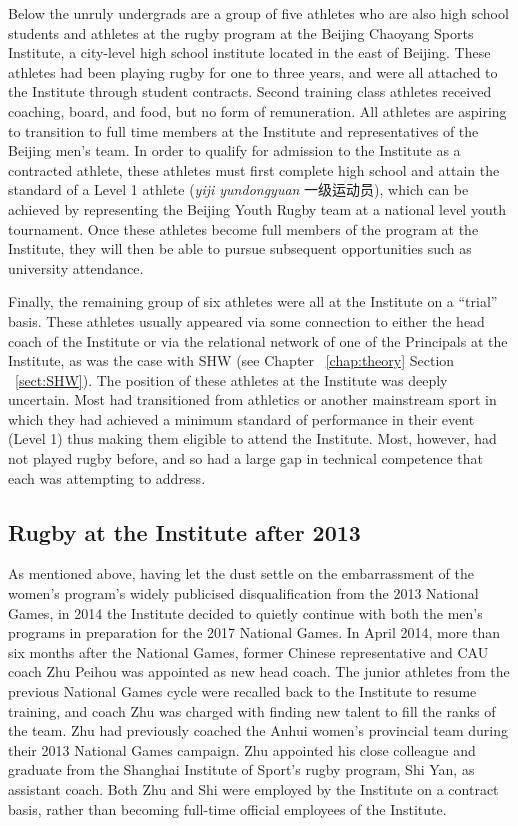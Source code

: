 \begin{CJK}{UTF8}{gbsn}
Below the unruly undergrads are a group of five athletes who are also high school students and athletes at the rugby program at the Beijing Chaoyang Sports Institute, a city-level high school institute located in the east of Beijing.  These athletes had been playing rugby for one to three years, and were all attached to the Institute through student contracts.  Second training class athletes received coaching, board, and food, but no form of remuneration.  All athletes are aspiring to transition to full time members at the Institute and representatives of the Beijing men's team.  In order to qualify for admission to the Institute as a contracted athlete, these athletes must first complete high school and attain the standard of a Level 1 athlete (\textit{yiji yundongyuan} 一级运动员), which can be achieved by representing the Beijing Youth Rugby team at a national level youth tournament.  Once these athletes become full members of the program at the Institute, they will then be able to pursue subsequent opportunities such as university attendance.

Finally, the remaining group of six athletes were all at the Institute on a ``trial'' basis.  These athletes usually appeared via some connection to either the head coach of the Institute or via the relational network of one of the Principals at the Institute, as was the case with SHW (see Chapter ~\ref{chap:theory} Section ~\ref{sect:SHW}). The position of these athletes at the Institute was deeply uncertain.  Most had transitioned from athletics or another mainstream sport in which they had achieved a minimum standard of performance in their event (Level 1) thus making them eligible to attend the Institute.  Most, however, had not played rugby before, and so had a large gap in technical competence that each was attempting to address.



\subsection{Rugby at the Institute after 2013}
As mentioned above, having let the dust settle on the embarrassment of the women's program's widely publicised disqualification from the 2013 National Games, in 2014 the Institute decided to quietly continue with both the men's programs in preparation for the 2017 National Games.  In April 2014, more than six months after the National Games, former Chinese representative and CAU coach Zhu Peihou was appointed as new head coach.  The junior athletes from the previous National Games cycle were recalled back to the Institute to resume training, and coach Zhu was charged with finding new talent to fill the ranks of the team.  Zhu had previously coached the Anhui women's provincial team during their 2013 National Games campaign.  Zhu appointed his close colleague and graduate from the Shanghai Institute of Sport's rugby program, Shi Yan, as assistant coach.  Both Zhu and Shi were employed by the Institute on a contract basis, rather than becoming full-time official employees of the Institute.


\end{CJK}

